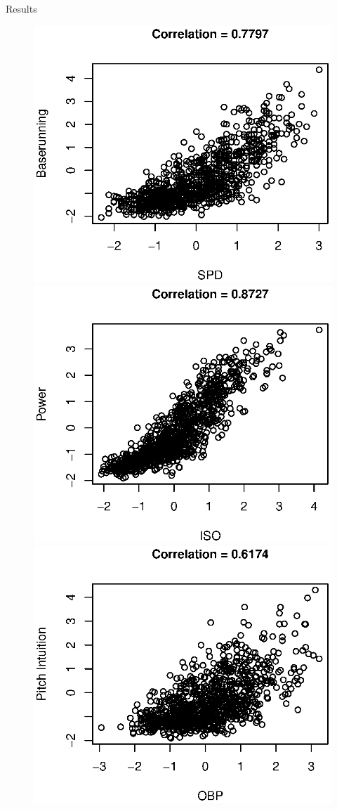 \documentclass{beamer}
\theoremstyle{definition}
\begin{document}
\begin{frame}{Results}
\begin{figure}
    \includegraphics[width=.75\textwidth]{img/fsdm_results/baserun_corr.eps}
\endminipage
\hfill
{}
    \includegraphics[width=.75\textwidth]{img/fsdm_results/power_corr.eps}
\endminipage\hfill
{}
    \includegraphics[width=.75\textwidth]{img/fsdm_results/pitch_intuit_corr.eps}

\end{figure}
\end{frame}
\end{document}
